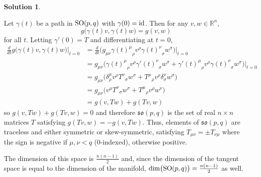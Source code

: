 \documentclass[11pt, a4paper]{report}
\theoremstyle{definition}
\newtheorem{solution}{Solution}[part]
\newenvironment{sol}{\begin{solution}}{\end{solution}\pagebreak[3]}
\newcommand*{\SO}{\ensuremath\text{SO}}
\newcommand*{\op}[1]{\ensuremath\mathop{}\mathopen{}#1}
\newcommand*{\id}{\op{\mathrm{id}}}
\begin{document}
\begin{sol}\label{sol:lorentzliealgebra}

Let $\gamma(t)$ be a path in $\SO(p, q)$ with $\gamma(0) = \id$. Then for any $v, w \in \mathbb{R}^n$,
\[
    g\bigl(\gamma(t)v, \gamma(t) w\bigr) = g(v, w)
\]
for all $t$. Letting $\gamma'(0) = T$ and differentiating at $t = 0$,
\begin{align*}
    \frac{d}{dt} g\bigl(\gamma(t)v, \gamma(t) w\bigr) \Big|_{t = 0} \! &=
        \frac{d}{dt} \bigl(
                g_{\mu\nu} {{\gamma(t)}^\mu}_\rho v^\rho {{\gamma(t)}^\nu}_\sigma w^\sigma
            \bigr) \Big|_{t = 0} \\
        &= g_{\mu\nu} \bigl(
                {{\gamma(t)}^\mu}_\rho v^\rho {{\gamma'(t)}^\nu}_\sigma w^\sigma
                + {{\gamma'(t)}^\mu}_\rho v^\rho {{\gamma(t)}^\nu}_\sigma w^\sigma
            \bigr) \Big|_{t = 0} \\
        &= g_{\mu\nu} \bigl(
                \delta^\mu_\rho v^\rho {T^\nu}_\sigma w^\sigma
                + {T^\mu}_\rho v^\rho \delta^\nu_\sigma w^\sigma
           \bigr) \\
        &= g_{\mu\nu} \bigl(
                v^\mu {T^\nu}_\sigma w^\sigma + {T^\mu}_\rho v^\rho w^\nu
           \bigr) \\
        &= g(v, Tw) + g(Tv, w)
\end{align*}
so $g(v, Tw) + g(Tv, w) = 0$
and therefore $\mathfrak{so}(p, q)$ is the set of real $n \times n$ matrices $T$ satisfying $g(Tv, w) = -g(v, Tw)$.
Thus, elements of $\mathfrak{so}(p, q)$ are traceless and either symmetric or skew-symmetric, satisfying $T_{\mu\nu} = \pm T_{\nu\mu}$ where the sign is negative if $\mu, \nu < q$ (0-indexed), otherwise positive.

The dimension of this space is $\frac{n(n - 1)}{2}$ and,
since the dimension of the tangent space is equal to the dimension of the manifold,
$\dim\bigl(\SO(p, q)\bigr) = \frac{n(n - 1)}{2}$ as well.


\end{sol}
\end{document}
